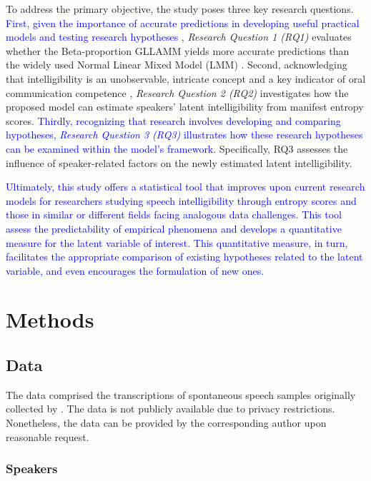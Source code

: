 \documentclass[
  authoryear,
  preprint,
  1p]{elsarticle}
\begin{document}
To address the primary objective, the study poses three key research
questions. \textcolor{blue}{First, given the importance of accurate predictions in
developing useful practical models and testing research hypotheses
\citep{Shmueli_et_al_2012},} \emph{Research Question 1 (RQ1)} evaluates
whether the Beta-proportion GLLAMM yields more accurate predictions than
the widely used Normal Linear Mixed Model (LMM)
\citep{Holmes_et_al_2019}. Second, acknowledging that intelligibility is
an unobservable, intricate concept and a key indicator of oral
communication competence \citep{Kent_et_al_1994}, \emph{Research
Question 2 (RQ2)} investigates how the proposed model can estimate
speakers' latent intelligibility from manifest entropy scores. \textcolor{blue}{Thirdly,
recognizing that research involves developing and comparing hypotheses,
\emph{Research Question 3 (RQ3)} illustrates how these research
hypotheses can be examined within the model's framework.} Specifically,
RQ3 assesses the influence of speaker-related factors on the newly
estimated latent intelligibility.

\textcolor{blue}{Ultimately, this study offers a statistical tool that improves upon
current research models for researchers studying speech intelligibility
through entropy scores and those in similar or different fields facing
analogous data challenges. This tool assess the predictability of
empirical phenomena and develops a quantitative measure for the latent
variable of interest. This quantitative measure, in turn, facilitates
the appropriate comparison of existing hypotheses related to the latent
variable, and even encourages the formulation of new ones.}

\section{Methods}\label{sec-methods}

\subsection{Data}\label{sec-M-D}

The data comprised the transcriptions of spontaneous speech samples
originally collected by \citet{Boonen_et_al_2021}. The data is not
publicly available due to privacy restrictions. Nonetheless, the data
can be provided by the corresponding author upon reasonable request.

\subsubsection{Speakers}\label{sec-M-S}
\end{document}
